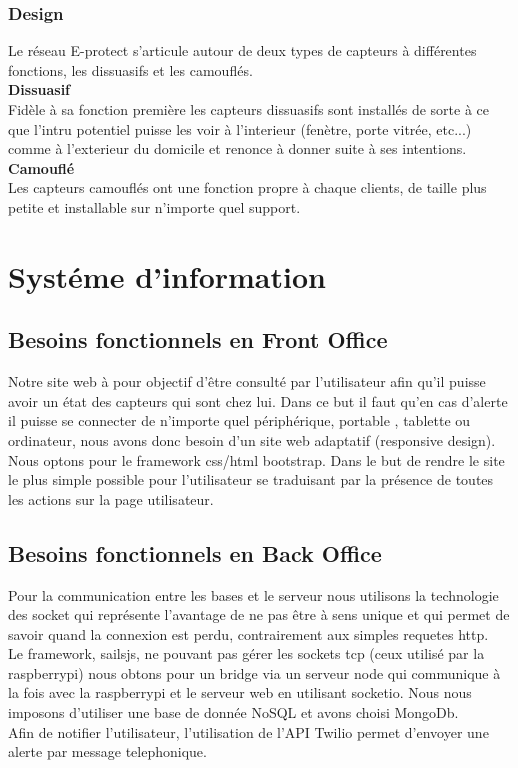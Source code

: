 \subsubsection{Design}
Le réseau E-protect s'articule autour de deux types de capteurs à différentes fonctions, les dissuasifs et les camouflés.\\
\textbf{Dissuasif}\\
Fidèle à sa fonction première les capteurs dissuasifs sont installés de sorte à ce que l'intru potentiel puisse les voir à l'interieur (fenètre, porte vitrée, etc...) comme à l'exterieur du domicile et renonce à donner suite à ses intentions.\\
\textbf{Camouflé}\\
Les capteurs camouflés ont une fonction propre à chaque clients, de taille plus petite et installable sur n'importe quel support.

\section{Systéme d'information}

\subsection{Besoins fonctionnels en Front Office}

Notre site web à pour objectif d’être consulté par l'utilisateur afin qu'il puisse avoir un état des capteurs qui sont chez lui. Dans ce but il faut qu'en cas d’alerte il puisse se connecter de n'importe quel périphérique, portable , tablette ou ordinateur, nous avons donc besoin d'un site web adaptatif (responsive design).\\
Nous optons pour le framework css/html bootstrap. Dans le but de rendre le site le plus simple possible pour l’utilisateur se traduisant par la présence de toutes les actions sur la page utilisateur.\\

\subsection{Besoins fonctionnels en Back Office}
Pour la communication entre les bases et le serveur nous utilisons la technologie des socket qui représente l’avantage de ne pas être à sens unique et qui permet de savoir quand la connexion est perdu, contrairement aux simples requetes http.\\
Le framework, sailsjs, ne pouvant pas gérer les sockets tcp (ceux utilisé par la raspberrypi) nous obtons pour un bridge via un serveur node qui communique à la fois avec la raspberrypi et le serveur web en utilisant socketio. Nous nous imposons d’utiliser une base de donnée NoSQL et avons choisi MongoDb.\\

Afin de notifier l'utilisateur, l'utilisation de l’API Twilio permet d'envoyer une alerte par message telephonique.\\

